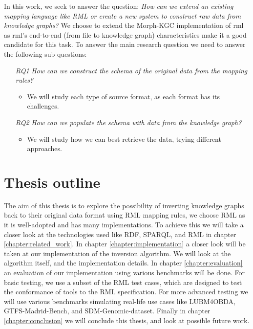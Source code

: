 In this work, we seek to answer the question: \textit{How can we extend an existing mapping language like RML or create a new system to construct raw data from knowledge graphs?} We choose to extend the Morph-KGC implementation \citep{arenas2022morph} of \acrshort{rml} \citep{dimou_ldow_2014} as \acrshort{rml}'s end-to-end (from file to knowledge graph) characteristics make it a good candidate for this task. To answer the main research question we need to answer the following sub-questions:
\begin{itemize}
    \item[\textit{RQ1}] \textit{How can we construct the schema of the original data from the mapping rules?}
    \begin{itemize}
        \item We will study each type of source format, as each format has its challenges.
    \end{itemize}
    \item[\textit{RQ2}] \textit{How can we populate the schema with data from the knowledge graph?}
    \begin{itemize}
        \item We will study how we can best retrieve the data, trying different approaches.
    \end{itemize}
\end{itemize}

\section{Thesis outline}
The aim of this thesis is to explore the possibility of inverting knowledge graphs back to their original data format using RML mapping rules, we choose RML as it is well-adopted and has many implementations. To achieve this we will take a closer look at the technologies used like RDF, SPARQL, and RML in chapter \ref{chapter:related_work}. 
In chapter \ref{chapter:implementation} a closer look will be taken at our implementation of the inversion algorithm. We will look at the algorithm itself, and the implementation details. 
In chapter \ref{chapter:evaluation} an evaluation of our implementation using various benchmarks will be done. For basic testing, we use a subset of the RML test cases, which are designed to test the conformance of tools to the RML specification. For more advanced testing we will use various benchmarks simulating real-life use cases like LUBM4OBDA, GTFS-Madrid-Bench, and SDM-Genomic-dataset. Finally in chapter \ref{chapter:conclusion} we will conclude this thesis, and look at possible future work.
